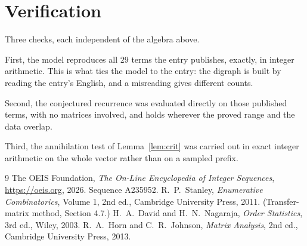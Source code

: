 \documentclass[11pt,a4paper]{article}
\theoremstyle{plain}
\theoremstyle{definition}
\begin{document}
\section{Verification}

Three checks, each independent of the algebra above.

First, the model reproduces all $29$ terms the entry publishes, exactly, in integer
arithmetic. This is what ties the model to the entry: the digraph is built by reading the
entry's English, and a misreading gives different counts.

Second, the conjectured recurrence was evaluated directly on those published terms, with no
matrices involved, and holds wherever the proved range and the data overlap.

Third, the annihilation test of Lemma~\ref{lem:crit} was carried out in exact integer
arithmetic on the whole vector rather than on a sampled prefix.

\begin{thebibliography}{9}
 The OEIS Foundation, \emph{The On-Line Encyclopedia of Integer
Sequences}, \url{https://oeis.org}, 2026. Sequence A235952.
 R.~P.~Stanley, \emph{Enumerative Combinatorics}, Volume 1, 2nd ed.,
Cambridge University Press, 2011. (Transfer-matrix method, Section 4.7.)
 H.~A.~David and H.~N.~Nagaraja, \emph{Order Statistics}, 3rd ed., Wiley,
2003.
 R.~A.~Horn and C.~R.~Johnson, \emph{Matrix Analysis}, 2nd ed., Cambridge
University Press, 2013.
\end{thebibliography}
\end{document}
